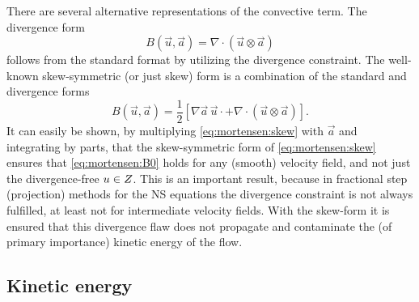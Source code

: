 There are several alternative representations of the convective
term. The divergence form
\begin{equation}
B(\vec{u},\vec{a})=\nabla \cdot (\vec{u} \otimes \vec{a})
\end{equation}
follows from the standard format by utilizing the divergence
constraint. The well-known skew-symmetric (or just skew) form is
a combination of the standard and divergence forms
\begin{equation}
 B(\vec{u},\vec{a}) = \frac{1}{2}\left[ \nabla \vec{a} \, \vec{u}\cdot
          + \nabla \cdot (\vec{u} \otimes \vec{a}) \right].
\label{eq:mortensen:skew}
\end{equation}
It can easily be shown, by multiplying \eqref{eq:mortensen:skew} with
$\vec{a}$ and integrating by parts, that the skew-symmetric form of
\eqref{eq:mortensen:skew} ensures that \eqref{eq:mortensen:B0} holds
for any (smooth) velocity field, and not just the divergence-free ${u} \in Z$.
This is an important result, because in fractional step (projection)
methods for the NS equations the divergence constraint is not always
fulfilled, at least not for intermediate velocity fields. With the
skew-form it is ensured that this divergence flaw does not propagate
and contaminate the (of primary importance) kinetic energy of the flow.

\subsection{Kinetic energy}
\label{sec:mortensen:kinetic}

